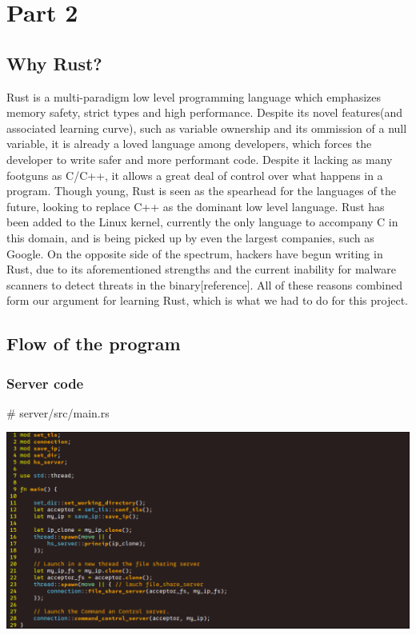 \documentclass[../main.tex]{subfiles}
\begin{document}
	\chapter{Part 2}


	\section{Why Rust?}


Rust is a multi-paradigm low level programming language which emphasizes memory safety, strict types and high performance. Despite its novel features(and associated learning curve),
such as variable ownership and its ommission of a null variable, it is already a loved language among developers, which forces the developer to write safer and more performant code.
Despite it lacking as many footguns as C/C++, it allows a great deal of control over what happens in a program. Though young, Rust is seen as the spearhead for the languages of the 
future, looking to replace C++ as the dominant low level language. Rust has been added to the Linux kernel, currently the only language to accompany C in this domain, and is being 
picked up by even the largest companies, such as Google. On the opposite side of the spectrum, hackers have begun writing in Rust, due to its aforementioned strengths and the 
current inability for malware scanners to detect threats in the binary[reference]. All of these reasons combined form our argument for learning Rust, which is what we had to do for
this project.

	\vspace{10pt}

	\section{Flow of the program}

	\subsection{Server code}

    \# server/src/main.rs

    \includegraphics[width=450pt]{server_main.png}
\end{document}
